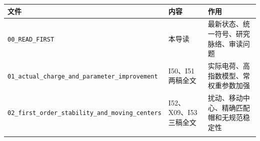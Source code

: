 \documentclass[
  10pt,
]{article}
\begin{document}
\begin{longtable}[]{@{}>{\raggedright\arraybackslash}p{\dimexpr(\linewidth-4\tabcolsep)/3\relax}>{\raggedright\arraybackslash}p{\dimexpr(\linewidth-4\tabcolsep)/3\relax}>{\raggedright\arraybackslash}p{\dimexpr(\linewidth-4\tabcolsep)/3\relax}@{}}
\toprule
\begin{minipage}[b]{0.30\columnwidth}\raggedright
文件\strut
\end{minipage} & \begin{minipage}[b]{0.30\columnwidth}\raggedright
内容\strut
\end{minipage} & \begin{minipage}[b]{0.30\columnwidth}\raggedright
作用\strut
\end{minipage}\tabularnewline
\midrule
\endhead
\begin{minipage}[t]{0.30\columnwidth}\raggedright
\nolinkurl{00_READ_FIRST}\strut
\end{minipage} & \begin{minipage}[t]{0.30\columnwidth}\raggedright
本导读\strut
\end{minipage} & \begin{minipage}[t]{0.30\columnwidth}\raggedright
最新状态、统一符号、研究脉络、审读问题\strut
\end{minipage}\tabularnewline
\begin{minipage}[t]{0.30\columnwidth}\raggedright
\nolinkurl{01_actual_charge_and_parameter_improvement}\strut
\end{minipage} & \begin{minipage}[t]{0.30\columnwidth}\raggedright
I50、I51两稿全文\strut
\end{minipage} & \begin{minipage}[t]{0.30\columnwidth}\raggedright
实际电荷、高指数模型、常权重参数加强\strut
\end{minipage}\tabularnewline
\begin{minipage}[t]{0.30\columnwidth}\raggedright
\nolinkurl{02_first_order_stability_and_moving_centers}\strut
\end{minipage} & \begin{minipage}[t]{0.30\columnwidth}\raggedright
I52、X09、I53三稿全文\strut
\end{minipage} & \begin{minipage}[t]{0.30\columnwidth}\raggedright
扰动、移动中心、精确匹配帽和无规范稳定性\strut
\end{minipage}\tabularnewline
\begin{minipage}[t]{0.30\columnwidth}\raggedright

\end{minipage}
\end{longtable}
\end{document}
